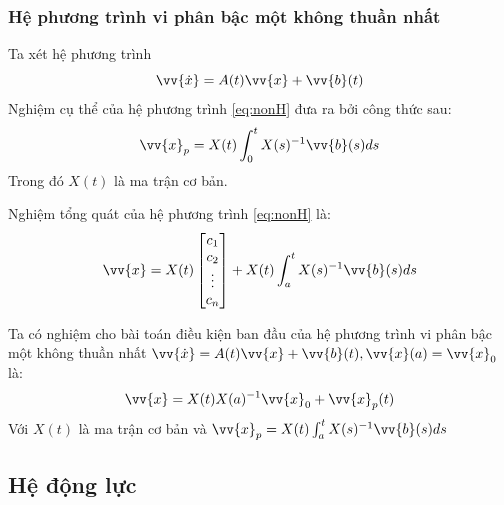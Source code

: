\documentclass[a4paper]{article}
\begin{document}
\subsubsection{Hệ phương trình vi phân bậc một không thuần nhất}
Ta xét hệ phương trình 
\begin{equation}\label{eq:nonH}
    \vv{\dot{x}} = A(t)\vv{x} + \vv{b}(t)
\end{equation}
Nghiệm cụ thể của hệ phương trình \eqref{eq:nonH} đưa ra bởi công thức sau:
\[
    \vv{x}_{p} = X(t) \int_0^{t} X(s)^{-1}\vv{b}(s) ds
\]
Trong đó $X(t)$ là ma trận cơ bản. \par
Nghiệm tổng quát của hệ phương trình \eqref{eq:nonH} là:
\[
    \vv{x} = X(t)
    \begin{bmatrix}
        c_1 \\ 
        c_2 \\ 
        \vdots \\
        c_n
    \end{bmatrix}
    + X(t) \int_a^{t} X(s)^{-1}\vv{b}(s) ds 
\] 

Ta có nghiệm cho bài toán điều kiện ban đầu của hệ phương trình vi phân bậc một không thuần nhất $    \vv{\dot{x}} = A(t)\vv{x} + \vv{b}(t), \vv{x}(a) = \vv{x}_0$ là: 
\[
    \vv{x} = X(t)X(a)^{-1}\vv{x}_0 + \vv{x}_p(t)
\]
Với $X(t)$ là ma trận cơ bản và  $\vv{x}_{p} = X(t) \int_a^{t} X(s)^{-1}\vv{b}(s) ds$
\subsection{Hệ động lực}
\end{document}
